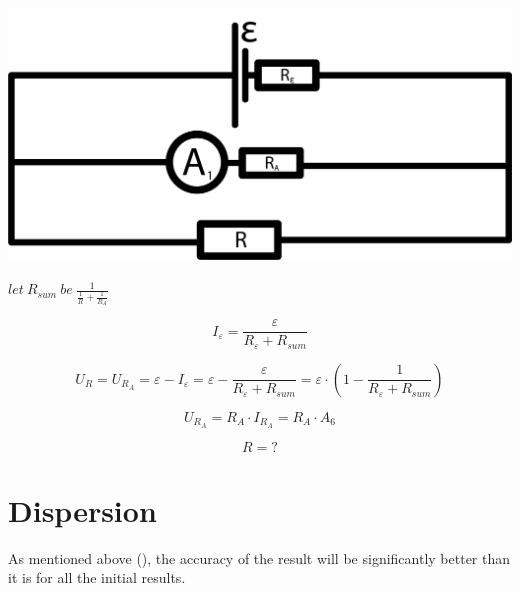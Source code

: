 \documentclass[11pt]{memoir}
\begin{document}
    \includegraphics[width=\linewidth]{../schemes/Scheme6.png}

    $let~ R_{sum} ~be~ \frac{1}{\frac{1}{R} + \frac{1}{R_A}}$

    \begin{equation*}
        I_{\varepsilon} = \frac{\varepsilon}{R_{\varepsilon} + R_{sum}}
    \end{equation*}

    \begin{equation*}
        U_R = U_{R_A} = \varepsilon - I_{\varepsilon} = \varepsilon - \frac{\varepsilon}{R_{\varepsilon} + R_{sum}}
        = \varepsilon \cdot \left( 1 - \frac{1}{R_{\varepsilon} + R_{sum}} \right)
    \end{equation*}

    \begin{equation*}
        U_{R_A} = R_A \cdot I_{R_A} = R_A \cdot A_6
    \end{equation*}

    \begin{equation}\label{eq:equation6}
        R = ?
    \end{equation}



%
%

    \section {Dispersion}\label{sec:dispersion}
        \newline
        As mentioned above (), the accuracy of the result will be significantly better than it is for all the initial results.
\end{document}
